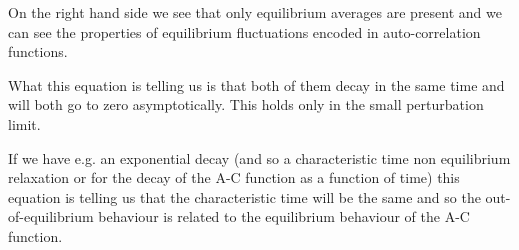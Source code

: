 \documentclass[\main/main.tex]{subfiles}
\begin{document}
On the right hand side we see that only equilibrium averages are present and we can see the properties of equilibrium fluctuations encoded in auto-correlation functions.

What this equation is telling us is that both of them decay in the same time and will both go to zero asymptotically. This holds only in the small perturbation limit.

If we have e.g. an exponential decay (and so a characteristic time non equilibrium relaxation or for the decay of the A-C function as a function of time) this equation is telling us that the characteristic time will be the same and so the out-of-equilibrium behaviour is related to the equilibrium behaviour of the A-C function.
\end{document}
